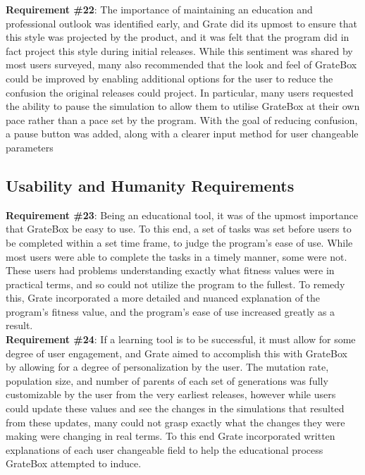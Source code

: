 \documentclass[12pt, titlepage]{article}
\begin{document}
\textbf{Requirement \#22}: The importance of maintaining an education and professional outlook was identified early, and Grate did its upmost to ensure that this style was projected by the product, and it was felt that the program did in fact project this style during initial releases. While this sentiment was shared by most users surveyed, many also recommended that the look and feel of GrateBox could be improved by enabling additional options for the user to reduce the confusion the original releases could project. In particular, many users requested the ability to pause the simulation to allow them to utilise GrateBox at their own pace rather than a pace set by the program. With the goal of reducing confusion, a pause button was added, along with a clearer input method for user changeable parameters 

\subsection{Usability and Humanity Requirements}

\textbf{Requirement \#23}: Being an educational tool, it was of the upmost importance that GrateBox be easy to use. To this end, a set of tasks was set before users to be completed within a set time frame, to judge the program's ease of use. While most users were able to complete the tasks in a timely manner, some were not. These users had problems understanding exactly what fitness values were in practical terms, and so could not utilize the program to the fullest. To remedy this, Grate incorporated a more detailed and nuanced explanation of the program's fitness value, and the program's ease of use increased greatly as a result.\\

\textbf{Requirement \#24}: If a learning tool is to be successful, it must allow for some degree of user engagement, and Grate aimed to accomplish this with GrateBox by allowing for a degree of personalization by the user. The mutation rate, population size, and number of parents of each set of generations was fully customizable by the user from the very earliest releases, however while users could update these values and see the changes in the simulations that resulted from these updates, many could not grasp exactly what the changes they were making were changing in real terms. To this end Grate incorporated written explanations of each user changeable field to help the educational process GrateBox attempted to induce.\\
\end{document}
